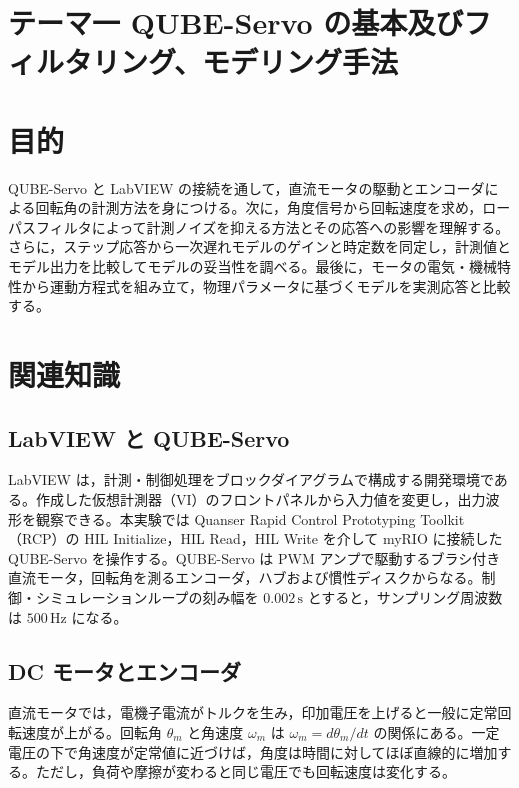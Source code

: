 \documentclass[dvipdfmx,a4paper,11pt]{jsarticle}
\begin{document}
\begin{jikkenTitle}
  \jikkenbi{}
  \kyoudou{}
  \preYoteibi{}\preTeishutsubi{}\repYoteibi{}\repTeishutsubi{}
\end{jikkenTitle}

\section*{テーマ一 QUBE-Servo の基本及びフィルタリング、モデリング手法}
\section{目的}
QUBE-Servo と LabVIEW の接続を通して，直流モータの駆動とエンコーダによる回転角の計測方法を身につける。次に，角度信号から回転速度を求め，ローパスフィルタによって計測ノイズを抑える方法とその応答への影響を理解する。さらに，ステップ応答から一次遅れモデルのゲインと時定数を同定し，計測値とモデル出力を比較してモデルの妥当性を調べる。最後に，モータの電気・機械特性から運動方程式を組み立て，物理パラメータに基づくモデルを実測応答と比較する。

\section{関連知識}
\subsection{LabVIEW と QUBE-Servo}
LabVIEW は，計測・制御処理をブロックダイアグラムで構成する開発環境である。作成した仮想計測器（VI）のフロントパネルから入力値を変更し，出力波形を観察できる。本実験では Quanser Rapid Control Prototyping Toolkit（RCP）の HIL Initialize，HIL Read，HIL Write を介して myRIO に接続した QUBE-Servo を操作する。QUBE-Servo は PWM アンプで駆動するブラシ付き直流モータ，回転角を測るエンコーダ，ハブおよび慣性ディスクからなる。制御・シミュレーションループの刻み幅を $0.002\,\mathrm{s}$ とすると，サンプリング周波数は $500\,\mathrm{Hz}$ になる\cite{manual}。

\subsection{DC モータとエンコーダ}
直流モータでは，電機子電流がトルクを生み，印加電圧を上げると一般に定常回転速度が上がる。回転角 $\theta_m$ と角速度 $\omega_m$ は $\omega_m=d\theta_m/dt$ の関係にある。一定電圧の下で角速度が定常値に近づけば，角度は時間に対してほぼ直線的に増加する。ただし，負荷や摩擦が変わると同じ電圧でも回転速度は変化する。
\end{document}

